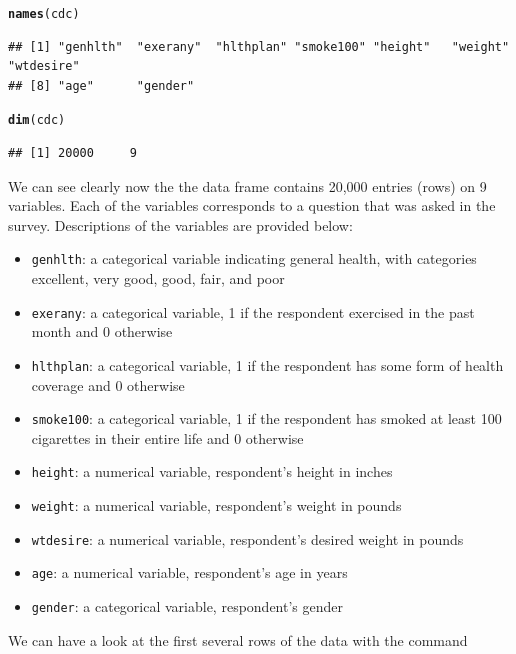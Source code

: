 \documentclass[11pt]{article}\usepackage[]{graphicx}\usepackage[]{color}
\makeatletter
\newcommand{\hlstd}[1]{\textcolor[rgb]{0.345,0.345,0.345}{#1}}%
\newcommand{\hlkwd}[1]{\textcolor[rgb]{0.737,0.353,0.396}{\textbf{#1}}}%
\newenvironment{kframe}{%
 \def\at@end@of@kframe{}%
 \ifinner\ifhmode%
  \def\at@end@of@kframe{\end{minipage}}%
  \begin{minipage}{\columnwidth}%
 \fi\fi%
 \def\FrameCommand##1{\hskip\@totalleftmargin \hskip-\fboxsep
 \colorbox{shadecolor}{##1}\hskip-\fboxsep
     \hskip-\linewidth \hskip-\@totalleftmargin \hskip\columnwidth}%
 \MakeFramed {\advance\hsize-\width
   \@totalleftmargin\z@ \linewidth\hsize
   \@setminipage}}%
 {\par\unskip\endMakeFramed%
 \at@end@of@kframe}
\newenvironment{knitrout}{}{} %
\makeatother
\begin{document}
\begin{knitrout}
\color{fgcolor}\begin{kframe}
\begin{alltt}
\hlkwd{names}\hlstd{(cdc)}
\end{alltt}
\begin{verbatim}
## [1] "genhlth"  "exerany"  "hlthplan" "smoke100" "height"   "weight"   "wtdesire"
## [8] "age"      "gender"
\end{verbatim}
\begin{alltt}
\hlkwd{dim}\hlstd{(cdc)}
\end{alltt}
\begin{verbatim}
## [1] 20000     9
\end{verbatim}
\end{kframe}
\end{knitrout}

We can see clearly now the the data frame contains 20,000 entries (rows) on 9 variables.  Each of the variables 
corresponds to a question that was asked in the survey.  Descriptions of the variables are provided below:  
\begin{itemize}
\item \texttt{genhlth}: a categorical variable indicating general health, with categories excellent, very good, good, fair, and poor
\item \texttt{exerany}: a categorical variable, 1 if the respondent exercised in the past month and 0 otherwise
\item \texttt{hlthplan}: a categorical variable, 1 if the respondent has some form of health coverage and 0 otherwise
\item \texttt{smoke100}: a categorical variable, 1 if the respondent has smoked at least 100 cigarettes in their entire life and 0 otherwise
\item \texttt{height}: a numerical variable, respondent's height in inches
\item \texttt{weight}: a numerical variable, respondent's weight in pounds
\item \texttt{wtdesire}: a numerical variable, respondent's desired weight in pounds
\item \texttt{age}: a numerical variable, respondent's age in years
\item \texttt{gender}: a categorical variable, respondent's gender\\
\end{itemize}

\normalsize
We can have a look at the first several rows of the data with the command
\end{document}
